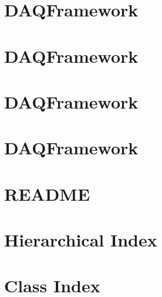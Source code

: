 \let\mypdfximage\pdfximage\def\pdfximage{\immediate\mypdfximage}\documentclass[twoside]{book}
\newcommand{\+}{\discretionary{\mbox{\scriptsize$\hookleftarrow$}}{}{}}
\begin{document}
\chapter{DAQFramework}
\label{md_UserTools_RunControl_README}

\chapter{DAQFramework}
\label{md_UserTools_StoreSave_README}

\chapter{DAQFramework}
\label{md_UserTools_template_README}

\chapter{DAQFramework}
\label{md_UserTools_VME_README}

\chapter{README}
\label{md_DataModel_README}

\chapter{Hierarchical Index}

\chapter{Class Index}

\end{document}
